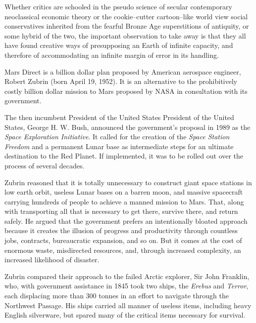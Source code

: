 Whether critics are schooled in the pseudo science of secular contemporary neoclassical economic theory or the cookie--cutter cartoon--like world view social conservatives inherited from the fearful Bronze Age superstitions of antiquity, or some hybrid of the two, the important observation to take away is that they all have found creative ways of presupposing an Earth of infinite capacity, and therefore of accommodating an infinite margin of error in its handling.

Mars Direct is a  billion dollar plan proposed by American aerospace engineer, Robert Zubrin (born April 19, 1952). It is an alternative to the prohibitively costly  billion dollar mission to Mars proposed by NASA in consultation with its government.

The then incumbent President of the United States President of the United States, George H. W. Bush, announced the government's proposal in 1989 as the {\it Space Exploration Initiative}. It called for the creation of the {\it Space Station Freedom} and a permanent Lunar base as intermediate steps for an ultimate destination to the Red Planet. If implemented, it was to be rolled out over the process of several decades.

Zubrin reasoned that it is totally unnecessary to construct giant space stations in low earth orbit, useless Lunar bases on a barren moon, and massive spacecraft carrying hundreds of people to achieve a manned mission to Mars. That, along with transporting all that is necessary to get there, survive there, and return safely. He argued that the government prefers an intentionally bloated approach because it creates the illusion of progress and productivity through countless jobs, contracts, bureaucratic expansion, and so on. But it comes at the cost of enormous waste, misdirected resources, and, through increased complexity, an increased likelihood of disaster.

Zubrin compared their approach to the failed Arctic explorer, Sir John Franklin, who, with government assistance in 1845 took two ships, the {\it Erebus} and {\it Terror}, each displacing more than 300 tonnes in an effort to navigate through the Northwest Passage. His ships carried all manner of useless items, including heavy English silverware, but spared many of the critical items necessary for survival. 

